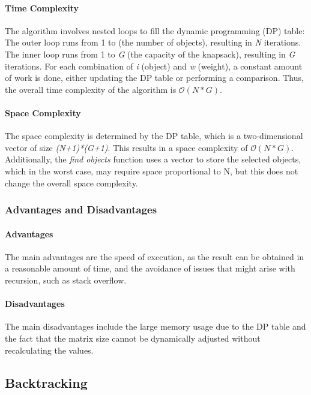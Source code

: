 \documentclass[runningheads]{llncs}
\begin{document}
\paragraph{Time Complexity}
The algorithm involves nested loops to fill the dynamic programming (DP) table:
The outer loop runs from 1 to  (the number of objects), resulting in \textit{N} iterations.
The inner loop runs from 1 to \textit{G} (the capacity of the knapsack), resulting in \textit{G} 
iterations. For each combination of \textit{i} (object) and \textit{w} (weight), a constant amount of work is done, either updating the DP table or performing a comparison. Thus, the overall time complexity of the algorithm is $\mathcal{O}(N*G)$.

\paragraph{Space Complexity}
The space complexity is determined by the DP table, which is a two-dimensional vector of size 
\textit{(N+1)*(G+1)}. This results in a space complexity of $\mathcal{O}(N*G)$.
Additionally, the \textit{find objects} function uses a vector to store the selected objects, which 
in the worst case, may require space proportional to N, but this does not change the overall space 
complexity.

\subsubsection{Advantages and Disadvantages}
\paragraph{Advantages}
The main advantages are the speed of execution, as the result can be obtained in a reasonable amount of time, and the avoidance of issues that might arise with recursion, such as stack overflow.

\paragraph{Disadvantages}
The main disadvantages include the large memory usage due to the DP table and the fact that the 
matrix size cannot be dynamically adjusted without recalculating the values.

\subsection{Backtracking}
\end{document}
